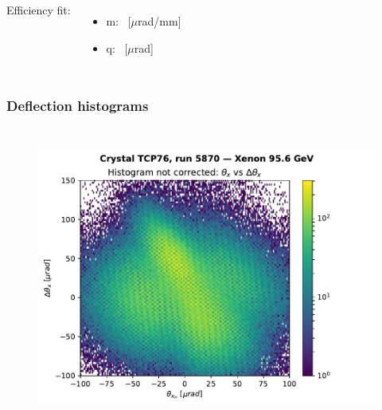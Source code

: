 \documentclass[10pt]{beamer}
\begin{document}
\begin{frame}
\begin{columns}[t]
Efficiency fit:
\begin{itemize}[leftmargin=*]
 \item m: \torsionm\ [$\mu$rad/mm]
 \item q: \torsionq\ [$\mu$rad]
\end{itemize}


\end{columns}
\end{frame}




\begin{frame}
\frametitle{Deflection histograms}

\begin{columns}[c] %

\begin{figure}
\includegraphics[width=\linewidth]{nocorr_histo.pdf}\\
\end{figure}


\end{columns}
\end{frame}
\end{document}
